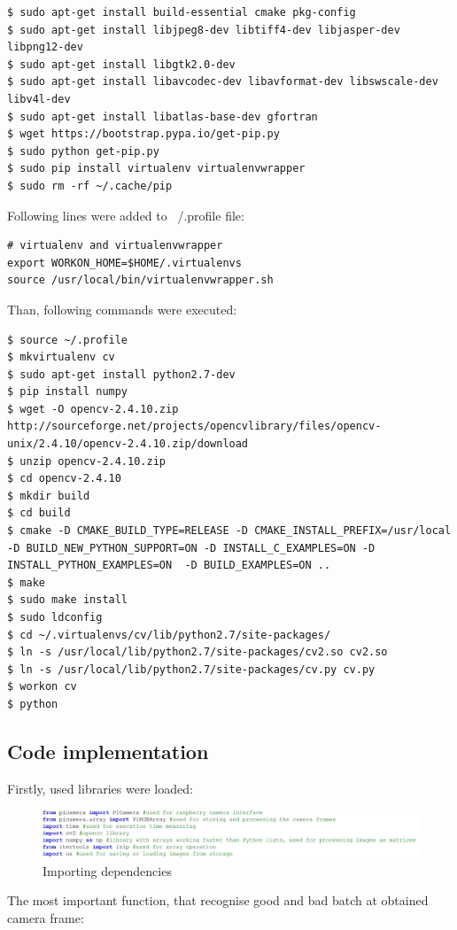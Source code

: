 \documentclass[12pt,twoside,a4paper]{article}
\begin{document}
\begin{lstlisting}
$ sudo apt-get install build-essential cmake pkg-config
$ sudo apt-get install libjpeg8-dev libtiff4-dev libjasper-dev libpng12-dev
$ sudo apt-get install libgtk2.0-dev
$ sudo apt-get install libavcodec-dev libavformat-dev libswscale-dev libv4l-dev
$ sudo apt-get install libatlas-base-dev gfortran
$ wget https://bootstrap.pypa.io/get-pip.py
$ sudo python get-pip.py
$ sudo pip install virtualenv virtualenvwrapper
$ sudo rm -rf ~/.cache/pip
\end{lstlisting}
Following lines were added to ~/.profile file:
\begin{lstlisting}
# virtualenv and virtualenvwrapper
export WORKON_HOME=$HOME/.virtualenvs
source /usr/local/bin/virtualenvwrapper.sh
\end{lstlisting}
Than, following commands were executed:
\begin{lstlisting}
$ source ~/.profile
$ mkvirtualenv cv
$ sudo apt-get install python2.7-dev
$ pip install numpy
$ wget -O opencv-2.4.10.zip http://sourceforge.net/projects/opencvlibrary/files/opencv-unix/2.4.10/opencv-2.4.10.zip/download
$ unzip opencv-2.4.10.zip
$ cd opencv-2.4.10
$ mkdir build
$ cd build
$ cmake -D CMAKE_BUILD_TYPE=RELEASE -D CMAKE_INSTALL_PREFIX=/usr/local -D BUILD_NEW_PYTHON_SUPPORT=ON -D INSTALL_C_EXAMPLES=ON -D INSTALL_PYTHON_EXAMPLES=ON  -D BUILD_EXAMPLES=ON ..
$ make
$ sudo make install
$ sudo ldconfig
$ cd ~/.virtualenvs/cv/lib/python2.7/site-packages/
$ ln -s /usr/local/lib/python2.7/site-packages/cv2.so cv2.so
$ ln -s /usr/local/lib/python2.7/site-packages/cv.py cv.py
$ workon cv
$ python
\end{lstlisting}

\subsection{Code implementation}

Firstly, used libraries were loaded:

\begin{figure}[H]
\centering
\includegraphics[width=0.8\paperwidth]{libs}
\caption{Importing dependencies}\label{fig:libs}
\end{figure}

The most important function, that recognise good and bad batch at obtained camera frame:
\end{document}

